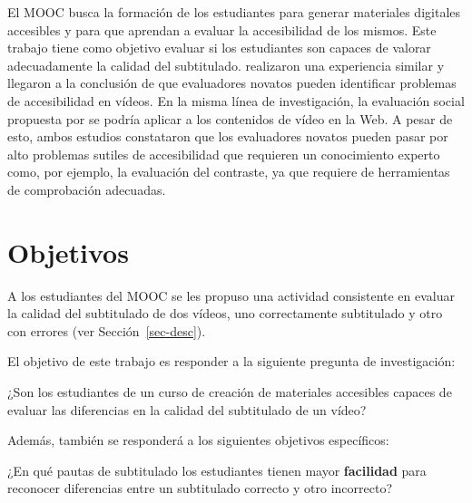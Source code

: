 \documentclass[
  12pt,
  a4paper,
  extrafontsizes,
  onecolumn,
  openright,
  table]{memoir}
\begin{document}
El MOOC busca la formación de los estudiantes para generar materiales
digitales accesibles y para que aprendan a evaluar la accesibilidad de
los mismos. Este trabajo tiene como objetivo evaluar si los estudiantes
son capaces de valorar adecuadamente la calidad del subtitulado.
\textcite{jperez2} realizaron una experiencia similar y llegaron a la
conclusión de que evaluadores novatos pueden identificar problemas de
accesibilidad en vídeos. En la misma línea de investigación, la
evaluación social propuesta por \textcite{kawanaka2008} se podría
aplicar a los contenidos de vídeo en la Web. A pesar de esto, ambos
estudios constataron que los evaluadores novatos pueden pasar por alto
problemas sutiles de accesibilidad que requieren un conocimiento experto
como, por ejemplo, la evaluación del contraste, ya que requiere de
herramientas de comprobación adecuadas.

\hypertarget{sec-objetivos}{%
\section{Objetivos}\label{sec-objetivos}}

A los estudiantes del MOOC se les propuso una actividad consistente en
evaluar la calidad del subtitulado de dos vídeos, uno correctamente
subtitulado y otro con errores (ver Sección~\ref{sec-desc}).

El objetivo de este trabajo es responder a la siguiente pregunta de
investigación:

\begin{tcolorbox}[enhanced jigsaw, arc=.35mm, bottomrule=.15mm, left=2mm, colframe=quarto-callout-note-color-frame, coltitle=black, colback=white, rightrule=.15mm, opacityback=0, breakable, leftrule=.75mm, colbacktitle=quarto-callout-note-color!10!white, opacitybacktitle=0.6, bottomtitle=1mm, toptitle=1mm, titlerule=0mm, title=\textcolor{quarto-callout-note-color}{\faInfo}\hspace{0.5em}{Pregunta de investigación}, toprule=.15mm]

¿Son los estudiantes de un curso de creación de materiales accesibles
capaces de evaluar las diferencias en la calidad del subtitulado de un
vídeo?

\end{tcolorbox}

Además, también se responderá a los siguientes objetivos específicos:

\begin{tcolorbox}[enhanced jigsaw, arc=.35mm, bottomrule=.15mm, left=2mm, colframe=quarto-callout-tip-color-frame, coltitle=black, colback=white, rightrule=.15mm, opacityback=0, breakable, leftrule=.75mm, colbacktitle=quarto-callout-tip-color!10!white, opacitybacktitle=0.6, bottomtitle=1mm, toptitle=1mm, titlerule=0mm, title=\textcolor{quarto-callout-tip-color}{\faLightbulb}\hspace{0.5em}{Objetivo específico}, toprule=.15mm]

¿En qué pautas de subtitulado los estudiantes tienen mayor
\textbf{facilidad} para reconocer diferencias entre un subtitulado
correcto y otro incorrecto?

\end{tcolorbox}
\end{document}
